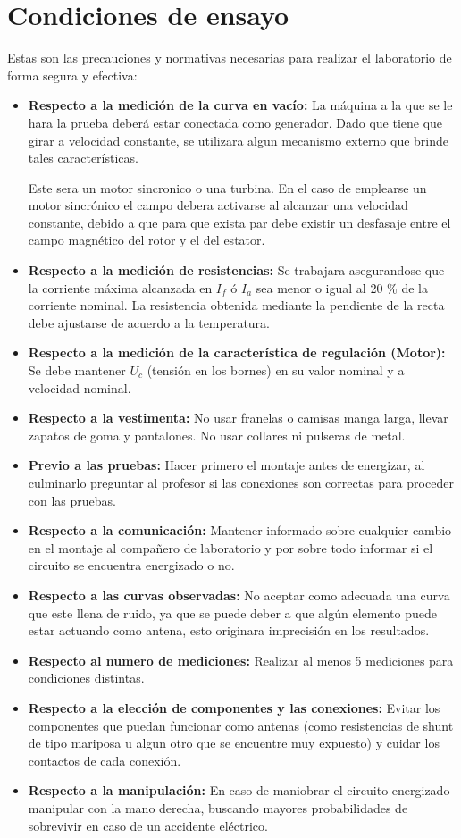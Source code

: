 \documentclass[11pt,letterpaper]{article}     %
\begin{document}
\section{Condiciones de ensayo}
Estas son las precauciones y normativas necesarias para realizar el laboratorio de forma segura y efectiva: 
\begin{itemize}
    \item \textbf{Respecto a la medición de la curva en vacío:} La máquina a la que se le hara la prueba deberá estar conectada como generador. Dado que tiene que girar a velocidad constante, se utilizara algun mecanismo externo que brinde tales características. 
    
    Este sera un motor sincronico o una turbina. En el caso de emplearse un motor sincrónico el campo debera activarse al alcanzar una velocidad constante, debido a que para que exista par debe existir un desfasaje entre el campo magnético del rotor y el del estator.
    \item \textbf{Respecto a la medición de resistencias:} Se trabajara asegurandose que la corriente máxima alcanzada en $I_{f}$ ó $I_{a}$ sea menor o igual al 20 \% de la corriente nominal. La resistencia obtenida mediante la pendiente de la recta debe ajustarse de acuerdo a la temperatura.
    \item \textbf{Respecto a la medición de la característica de regulación (Motor):} Se debe mantener $U_{c}$ (tensión en los bornes) en su valor nominal y a velocidad nominal. 
    \item \textbf{Respecto a la  vestimenta:} No usar franelas o camisas manga larga, llevar zapatos de goma y pantalones. No usar collares ni pulseras de metal.
    \item \textbf{Previo a las pruebas:} Hacer primero el montaje antes de energizar, al culminarlo preguntar al profesor si las conexiones son correctas para proceder con las pruebas.
    \item \textbf{Respecto a la comunicación:} Mantener informado sobre cualquier cambio en el montaje al compañero de laboratorio y por sobre todo informar si el circuito se encuentra energizado o no.
	\item \textbf{Respecto a las curvas observadas:} No aceptar como adecuada una curva que este llena de ruido, ya que se puede deber a que algún elemento puede estar actuando como antena, esto originara imprecisión en los resultados.
	\item \textbf{Respecto al numero de mediciones:}
	Realizar al menos 5 mediciones para condiciones distintas.
	\item \textbf{Respecto a la elección de componentes y las conexiones:} Evitar los componentes que puedan funcionar como antenas (como resistencias de shunt de tipo mariposa u algun otro que se encuentre muy expuesto) y cuidar los contactos de cada conexión.
    \item \textbf{Respecto a la manipulación:} En caso de maniobrar el circuito energizado manipular con la mano derecha, buscando mayores probabilidades de sobrevivir en caso de un accidente eléctrico.
\end{itemize}
\end{document}
